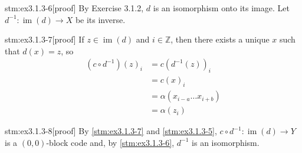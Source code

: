 \begin{stm}{stm:ex3.1.3-6}[proof]
By Exercise 3.1.2, $d$ is an isomorphism onto its image. Let $d^{-1}: \operatorname{im}(d) \to X$ be its inverse.
\end{stm}

\begin{stm}{stm:ex3.1.3-7}[proof]
If $z \in \operatorname{im}(d)$ and $i \in \mathbb{Z}$, then there exists a unique $x$ such that $d(x) = z$, so
\begin{align*}
(c \circ d^{-1})(z)_i &= c(d^{-1}(z))_i \\
&= c(x)_i \\
&= \alpha(x_{i-a} \ldots x_{i+b}) \\
&= \alpha(z_i)
\end{align*}
\end{stm}

\begin{stm}{stm:ex3.1.3-8}[proof]
By \ref{stm:ex3.1.3-7} and \ref{stm:ex3.1.3-5}, $c \circ d^{-1}: \operatorname{im}(d) \to Y$ is a $(0,0)$-block code and, by \ref{stm:ex3.1.3-6}, $d^{-1}$ is an isomorphism.
\end{stm}
